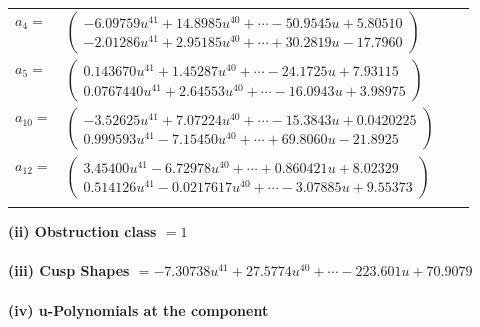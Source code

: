 \documentclass[1p]{elsarticle_modified}
\theoremstyle{definition}
\begin{document}
\begin{tabular}{m{7pt} m{180pt} m{7pt} m{180pt} }
\flushright $a_{4}=$&$\begin{pmatrix}-6.09759 u^{41}+14.8985 u^{40}+\cdots-50.9545 u+5.80510\\-2.01286 u^{41}+2.95185 u^{40}+\cdots+30.2819 u-17.7960\end{pmatrix}$ \\
\flushright $a_{5}=$&$\begin{pmatrix}0.143670 u^{41}+1.45287 u^{40}+\cdots-24.1725 u+7.93115\\0.0767440 u^{41}+2.64553 u^{40}+\cdots-16.0943 u+3.98975\end{pmatrix}$ \\
\flushright $a_{10}=$&$\begin{pmatrix}-3.52625 u^{41}+7.07224 u^{40}+\cdots-15.3843 u+0.0420225\\0.999593 u^{41}-7.15450 u^{40}+\cdots+69.8060 u-21.8925\end{pmatrix}$ \\
\flushright $a_{12}=$&$\begin{pmatrix}3.45400 u^{41}-6.72978 u^{40}+\cdots+0.860421 u+8.02329\\0.514126 u^{41}-0.0217617 u^{40}+\cdots-3.07885 u+9.55373\end{pmatrix}$\\&\end{tabular}
\flushleft \textbf{(ii) Obstruction class $= 1$}\\~\\
\flushleft \textbf{(iii) Cusp Shapes $= -7.30738 u^{41}+27.5774 u^{40}+\cdots-223.601 u+70.9079$}\\~\\
\newpage\renewcommand{\arraystretch}{1}
\flushleft \textbf{(iv) u-Polynomials at the component}\newline \\
\end{document}
